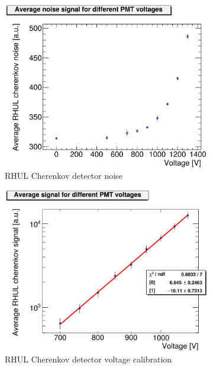 \begin{figure}
\centering
\begin{subfigure}[b]{0.49\textwidth}
 \centering
\includegraphics[width=\textwidth]{Figures/ATF/AverageNoise_perVoltage_08April.pdf}
\caption{RHUL Cherenkov detector noise}
\end{subfigure}
\hfill
\begin{subfigure}[b]{0.49\textwidth}
  \centering
  \includegraphics[width=\textwidth]{Figures/ATF/VoltageNormalization_totError.pdf}
\caption{RHUL Cherenkov detector voltage calibration}
\end{subfigure}
\caption[RHUL Cherenkov detector calibrations]{
}
\end{figure}
